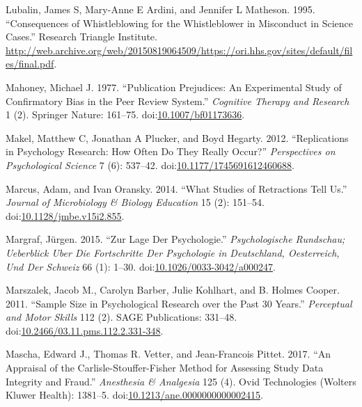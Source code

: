 \documentclass[a5paper]{book}
\begin{document}
\hypertarget{ref-lubalin1995}{}
Lubalin, James S, Mary-Anne E Ardini, and Jennifer L Matheson. 1995.
``Consequences of Whistleblowing for the Whistleblower in Misconduct in
Science Cases.'' Research Triangle Institute.
\url{http://web.archive.org/web/20150819064509/https://ori.hhs.gov/sites/default/files/final.pdf}.

\hypertarget{ref-doi:10.1007ux2fbf01173636}{}
Mahoney, Michael J. 1977. ``Publication Prejudices: An Experimental
Study of Confirmatory Bias in the Peer Review System.'' \emph{Cognitive
Therapy and Research} 1 (2). Springer Nature: 161--75.
doi:\href{https://doi.org/10.1007/bf01173636}{10.1007/bf01173636}.

\hypertarget{ref-doi:10.1177ux2f1745691612460688}{}
Makel, Matthew C, Jonathan A Plucker, and Boyd Hegarty. 2012.
``Replications in Psychology Research: How Often Do They Really Occur?''
\emph{Perspectives on Psychological Science} 7 (6): 537--42.
doi:\href{https://doi.org/10.1177/1745691612460688}{10.1177/1745691612460688}.

\hypertarget{ref-doi:10.1128ux2fjmbe.v15i2.855}{}
Marcus, Adam, and Ivan Oransky. 2014. ``What Studies of Retractions Tell
Us.'' \emph{Journal of Microbiology \& Biology Education} 15 (2):
151--54.
doi:\href{https://doi.org/10.1128/jmbe.v15i2.855}{10.1128/jmbe.v15i2.855}.

\hypertarget{ref-doi:10.1026ux2f0033-3042ux2fa000247}{}
Margraf, Jürgen. 2015. ``Zur Lage Der Psychologie.''
\emph{Psychologische Rundschau; Ueberblick Uber Die Fortschritte Der
Psychologie in Deutschland, Oesterreich, Und Der Schweiz} 66 (1): 1--30.
doi:\href{https://doi.org/10.1026/0033-3042/a000247}{10.1026/0033-3042/a000247}.

\hypertarget{ref-doi:10.2466ux2f03.11.pms.112.2.331-348}{}
Marszalek, Jacob M., Carolyn Barber, Julie Kohlhart, and B. Holmes
Cooper. 2011. ``Sample Size in Psychological Research over the Past 30
Years.'' \emph{Perceptual and Motor Skills} 112 (2). SAGE Publications:
331--48.
doi:\href{https://doi.org/10.2466/03.11.pms.112.2.331-348}{10.2466/03.11.pms.112.2.331-348}.

\hypertarget{ref-doi:10.1213ux2fane.0000000000002415}{}
Mascha, Edward J., Thomas R. Vetter, and Jean-Francois Pittet. 2017.
``An Appraisal of the Carlisle-Stouffer-Fisher Method for Assessing
Study Data Integrity and Fraud.'' \emph{Anesthesia \& Analgesia} 125
(4). Ovid Technologies (Wolters Kluwer Health): 1381--5.
doi:\href{https://doi.org/10.1213/ane.0000000000002415}{10.1213/ane.0000000000002415}.
\end{document}
